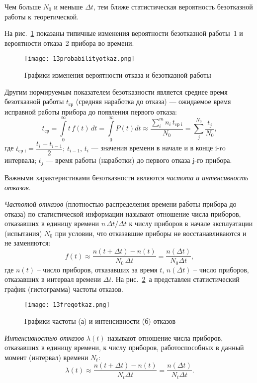 Чем больше $ N_0 $ и меньше $ \Delta t $, тем ближе статистическая вероятность безотказной работы к теоретической.

На рис.~\ref{pic:13probabilityotkaz} показаны типичные изменения вероятности безотказной работы~1 и вероятности отказа~2 прибора во времени.

\begin{figure}[h!]
	\caption{ Графики изменения вероятности отказа и безотказной работы }
	\texttt{[image: 13probabilityotkaz.png]}
	\label{pic:13probabilityotkaz}
\end{figure}

Другим нормируемым показателем безотказности является среднее время безотказной работы $ t_\text{ср} $ (средняя наработка до отказа) --- ожидаемое время исправной работы прибора до появления первого отказа:
\[ t_\text{ср} = \int\limits_{0}^{\infty} t \, f(t)\, dt = \int\limits_{0}^{\infty} P(t)dt \approx \dfrac{\sum\limits_{i}^{m}n_i\,t_\text{cр i}}{N_0} = \sum\limits_{j}^{N_0} \dfrac{t_j}{N_0}, \]
где $ t_\text{cр i} = \dfrac{t_i - t_{i-1}}{2};\,t_{i-1},\,t_i $ --- значения времени в начале и в конце i-ro интервала; $ t_j $ --- время работы (наработки) до первого отказа j-го прибора.

Важными характеристиками безотказности являются \textit{частота и интенсивность отказов}.

\textit{Частотой отказов} (плотностью распределения времени работы прибора до отказа) по статистической информации называют отношение числа приборов, отказавших в единицу времени $ n\,\Delta t/\Delta t $ к числу приборов в начале эксплуатации (испытания) $ N_0 $ при условии, что отказавшие приборы не восстанавливаются и не заменяются:
\[ f(t)\approx \dfrac{n(t+\Delta t) - n(t)}{N_0 \, \Delta t} = \dfrac{n(\Delta t)}{N_0 \Delta t},   \]
где $ n(t) $ -- число приборов, отказавших за время $ t $, $ n(\Delta t) $ -- число приборов, отказавших в интервал времени $ \Delta t $.
На рис.~\ref{pic:13freqotkaz}~а представлен статистический график (гистограмма) частоты отказов.

\begin{figure}[h!]
	\caption{ Графики частоты (а) и интенсивности (б) отказов }
	\texttt{[image: 13freqotkaz.png]}
	\label{pic:13freqotkaz}
\end{figure}

\textit{Интенсивностью отказов $ \lambda(t) $} называют отношение числа приборов, отказавших в единицу времени, к числу приборов, работоспособных в данный момент (интервал) времени $ N_t $:
\[ \lambda (t) \approx \dfrac{n(t+\Delta t) - n(t)}{N_t\Delta t} = \dfrac{n(\Delta t)}{N_t\Delta t}. \]

